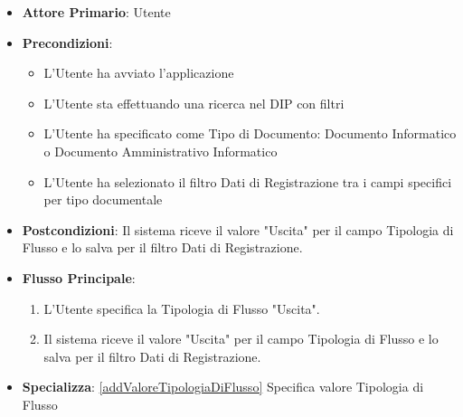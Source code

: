 \begin{itemize}
      \item \textbf{Attore Primario}: Utente
      \item \textbf{Precondizioni}: 
      \begin{itemize}            
            \item L'Utente ha avviato l'applicazione
            \item L'Utente sta effettuando una ricerca nel DIP con filtri
            \item L'Utente ha specificato come Tipo di Documento: Documento Informatico o Documento Amministrativo Informatico
            \item L'Utente ha selezionato il filtro Dati di Registrazione tra i campi specifici per tipo documentale
      \end{itemize}
      \item \textbf{Postcondizioni}: Il sistema riceve il valore "Uscita" per il campo Tipologia di Flusso e lo salva per il filtro Dati di Registrazione.
      \item \textbf{Flusso Principale}:
      \begin{enumerate}
            \item L'Utente specifica la Tipologia di Flusso "Uscita".
            \item Il sistema riceve il valore "Uscita" per il campo Tipologia di Flusso e lo salva per il filtro Dati di Registrazione.
      \end{enumerate}
      \item \textbf{Specializza}: \ref{addValoreTipologiaDiFlusso} Specifica valore Tipologia di Flusso
\end{itemize}

